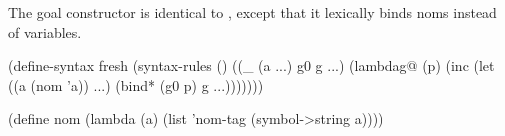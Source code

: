 The goal constructor  is identical to ,
except that it lexically binds noms instead of variables.



\schemedisplayspace
\begin{schemedisplay}
(define-syntax fresh
  (syntax-rules ()
    ((_ (a ...) g0 g ...)
     (lambdag@ (p)
       (inc
         (let ((a (nom 'a)) ...)
           (bind* (g0 p) g ...)))))))

(define nom
  (lambda (a)
    (list 'nom-tag (symbol->string a))))
\end{schemedisplay}






